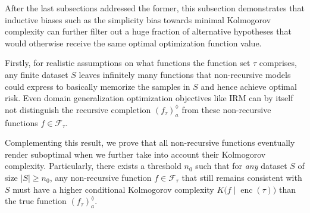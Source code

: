 After the last subsections addressed the former, this subsection demonstrates that inductive biases such as the simplicity bias towards minimal Kolmogorov complexity can further filter out a huge fraction of alternative hypotheses that would otherwise receive the same optimal optimization function value.

Firstly, for realistic assumptions on what functions the function set $\tau$ comprises, any finite dataset $S$ leaves infinitely many functions that non-recursive models could express to basically memorize the samples in $S$ and hence achieve optimal risk.
Even domain generalization optimization objectives like IRM can by itself not distinguish the recursive completion $\left(f_{\tau}\right)_a^{\lozenge}$ from these non-recursive functions $f\in \mathcal{F}_{\tau}$.

Complementing this result, we prove that all non-recursive functions eventually render suboptimal when we further take into account their Kolmogorov complexity.
Particularly, there exists a threshold $n_0$ such that for \textit{any} dataset $S$ of size $|S|\geq n_0$, any non-recursive function $f\in\mathcal{F}_{\tau}$ that still remains consistent with $S$ must have a higher conditional Kolmogorov complexity $K\bigl(f\mid \operatorname{enc}(\tau)\bigr)$ than the true function $\left(f_{\tau}\right)_a^{\lozenge}$.


